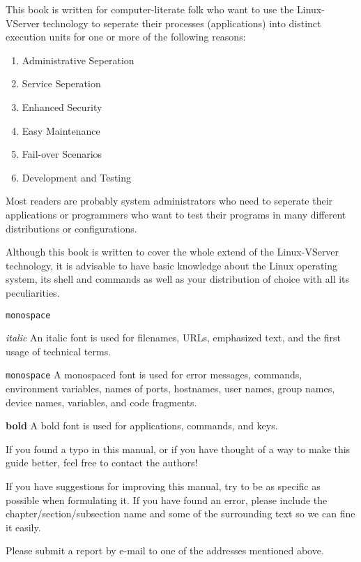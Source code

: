 



This book is written for computer-literate folk who want to use the
Linux-VServer technology to seperate their processes (applications) into
distinct execution units for one or more of the following reasons:

\begin{enumerate}
\item Administrative Seperation
\item Service Seperation
\item Enhanced Security
\item Easy Maintenance
\item Fail-over Scenarios
\item Development and Testing
\end{enumerate}

Most readers are probably system administrators who need to seperate their
applications or programmers who want to test their programs in many different
distributions or configurations.

Although this book is written to cover the whole extend of the Linux-VServer
technology, it is advisable to have basic knowledge about the Linux operating
system, its shell and commands as well as your distribution of choice with all
its peculiarities.







\begin{labeling}{\texttt{monospace}}
\item[\textit{italic}] An italic font is used for filenames, URLs, emphasized
text, and the first usage of technical terms.

\item[\texttt{monospace}] A monospaced font is used for error messages,
commands, environment variables, names of ports, hostnames, user names, group
names, device names, variables, and code fragments.

\item[\textbf{bold}] A bold font is used for applications, commands, and keys.
\end{labeling}







If you found a typo in this manual, or if you have thought of a way to make this
guide better, feel free to contact the authors!

If you have suggestions for improving this manual, try to be as specific as
possible when formulating it. If you have found an error, please include the
chapter/section/subsection name and some of the surrounding text so we can fine
it easily.

Please submit a report by e-mail to one of the addresses mentioned above.
